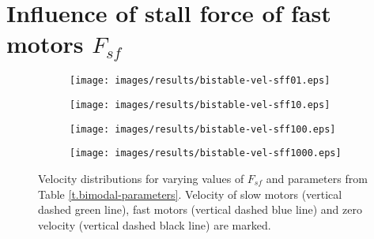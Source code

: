\section{Influence of stall force of fast motors $F_{sf}$}
\begin{figure}[h]
\centering
\begin{subfigure}{0.35\textwidth}
 \texttt{[image: images/results/bistable-vel-sff01.eps]}
\end{subfigure}
\begin{subfigure}{0.35\textwidth}
 \texttt{[image: images/results/bistable-vel-sff10.eps]}
\end{subfigure}
\begin{subfigure}{0.35\textwidth}
 \texttt{[image: images/results/bistable-vel-sff100.eps]}
\end{subfigure}
\begin{subfigure}{0.35\textwidth}
 \texttt{[image: images/results/bistable-vel-sff1000.eps]}
\end{subfigure}
\caption[Influence of stall force of fast motors $F_{sf}$ on bimodal velocity distribution]{Velocity distributions for varying values of $F_{sf}$ and parameters from Table \ref{t.bimodal-parameters}. Velocity of slow motors (vertical dashed green line), fast motors (vertical dashed blue line) and zero velocity (vertical dashed black line) are marked.} 
\label{img.bimodal-sff-comparison}
\end{figure}



% 




